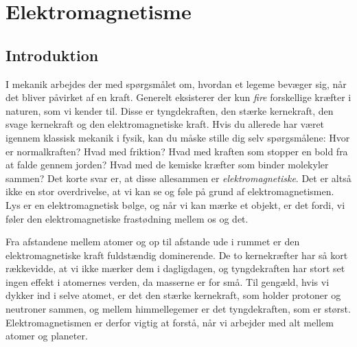 \chapter{Elektromagnetisme} \label{chap:el}

\section{Introduktion}

I mekanik arbejdes der med spørgsmålet om, hvordan et legeme bevæger sig, når det bliver påvirket af en kraft. Generelt eksisterer der kun \emph{fire} forskellige kræfter i naturen, som vi kender til. Disse er tyngdekraften, den stærke kernekraft, den svage kernekraft og den elektromagnetiske kraft. Hvis du allerede har været igennem klassisk mekanik i fysik, kan du måske stille dig selv spørgsmålene: Hvor er normalkraften? Hvad med friktion? Hvad med kraften som stopper en bold fra at falde gennem jorden? Hvad med de kemiske kræfter som binder molekyler sammen? Det korte svar er, at disse allesammen er \emph{elektromagnetiske}. Det er altså ikke en stor overdrivelse, at vi kan se og føle på grund af elektromagnetismen. Lys er en elektromagnetisk bølge, og når vi kan mærke et objekt, er det fordi, vi føler den elektromagnetiske frastødning mellem os og det.

Fra afstandene mellem atomer og op til afstande ude i rummet er den elektromagnetiske kraft fuldstændig dominerende. De to kernekræfter har så kort rækkevidde, at vi ikke mærker dem i dagligdagen, og tyngdekraften har stort set ingen effekt i atomernes verden, da masserne er for små. Til gengæld, hvis vi dykker ind i selve atomet, er det den stærke kernekraft, som holder protoner og neutroner sammen, og mellem himmellegemer er det tyngdekraften, som er størst. Elektromagnetismen er derfor vigtig at forstå, når vi arbejder med alt mellem atomer og planeter.

